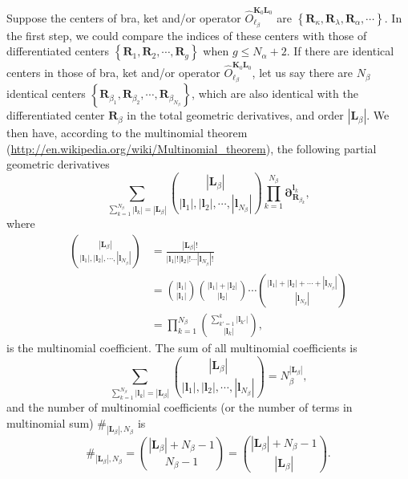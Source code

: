 \documentclass[a4paper,11pt,twoside,openright]{book}
\begin{document}
Suppose the centers of bra, ket and/or operator $\hat{O}_{\ell_{\beta}}^{\boldsymbol{K}_{0}\boldsymbol{L}_{0}}$
are $\left\{\boldsymbol{R}_{\kappa},\boldsymbol{R}_{\lambda},\boldsymbol{R}_{\alpha},\cdots\right\}$. In the first
step, we could compare the indices of these centers with those of differentiated centers
$\left\{\boldsymbol{R}_{1},\boldsymbol{R}_{2},\cdots,\boldsymbol{R}_{g}\right\}$ when $g\le N_{\alpha}+2$.
If there are identical centers in those of bra, ket and/or operator $\hat{O}_{\ell_{\beta}}^{\boldsymbol{K}_{0}\boldsymbol{L}_{0}}$,
let us say there are $N_{\beta}$ identical centers
$\left\{\boldsymbol{R}_{\beta_{1}},\boldsymbol{R}_{\beta_{2}},\cdots,\boldsymbol{R}_{\beta_{N_{\beta}}}\right\}$,
which are also identical with the differentiated center $\boldsymbol{R}_{\beta}$ in the total geometric derivatives,
and order $|\boldsymbol{L}_{\beta}|$. We then have, according to the multinomial theorem
(\url{http://en.wikipedia.org/wiki/Multinomial_theorem}), the following partial geometric derivatives
\begin{equation}
  \sum_{\sum_{k=1}^{N_{\beta}}|\boldsymbol{l}_{k}|=|\boldsymbol{L}_{\beta}|}%
    \binom{|\boldsymbol{L}_{\beta}|}{|\boldsymbol{l}_{1}|,|\boldsymbol{l}_{2}|,\cdots,|\boldsymbol{l}_{N_{\beta}}|}%
    \prod_{k=1}^{N_{\beta}}\boldsymbol{\partial}_{\boldsymbol{R}_{\beta_{k}}}^{\boldsymbol{l}_{k}},
\end{equation}
where
\begin{align}
  \binom{|\boldsymbol{L}_{\beta}|}{|\boldsymbol{l}_{1}|,|\boldsymbol{l}_{2}|,\cdots,|\boldsymbol{l}_{N_{\beta}}|}
  &=\frac{|\boldsymbol{L}_{\beta}|!}{|\boldsymbol{l}_{1}|!|\boldsymbol{l}_{2}|!\cdots|\boldsymbol{l}_{N_{\beta}}|!}\\
  &=\binom{|\boldsymbol{l}_{1}|}{|\boldsymbol{l}_{1}|}\binom{|\boldsymbol{l}_{1}|+|\boldsymbol{l}_{2}|}{|\boldsymbol{l}_{2}|}%
    \cdots\binom{|\boldsymbol{l}_{1}|+|\boldsymbol{l}_{2}|+\cdots+|\boldsymbol{l}_{N_{\beta}}|}{|\boldsymbol{l}_{N_{\beta}}|}\\
  &=\prod_{k=1}^{N_{\beta}}\binom{\sum_{k'=1}^{k}|\boldsymbol{l}_{k'}|}{|\boldsymbol{l}_{k}|},
\end{align}
is the multinomial coefficient. The sum of all multinomial coefficients is
\begin{equation}
  \sum_{\sum_{k=1}^{N_{\beta}}|\boldsymbol{l}_{k}|=|\boldsymbol{L}_{\beta}|}%
    \binom{|\boldsymbol{L}_{\beta}|}{|\boldsymbol{l}_{1}|,|\boldsymbol{l}_{2}|,\cdots,|\boldsymbol{l}_{N_{\beta}}|}%
  =N_{\beta}^{|\boldsymbol{L}_{\beta}|},
\end{equation}
and the number of multinomial coefficients (or the number of terms in multinomial sum)
$\#_{|\boldsymbol{L}_{\beta}|,N_{\beta}}$ is
\begin{equation}
  \#_{|\boldsymbol{L}_{\beta}|,N_{\beta}}
  =\binom{|\boldsymbol{L}_{\beta}|+N_{\beta}-1}{N_{\beta}-1}
  =\binom{|\boldsymbol{L}_{\beta}|+N_{\beta}-1}{|\boldsymbol{L}_{\beta}|}.
\end{equation}
\end{document}
